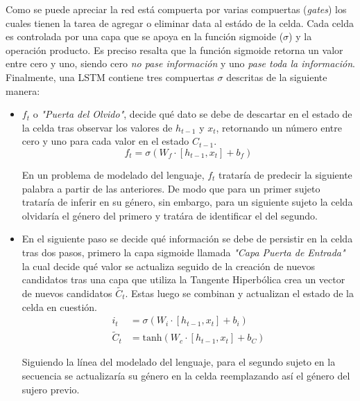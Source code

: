 \documentclass[12pt, letterpaper]{article}
\begin{document}
        Como se puede apreciar la red está compuerta por varias compuertas (\emph{gates}) los cuales tienen la tarea de agregar o eliminar data al estádo de la celda. Cada celda es controlada por una capa que se apoya en la función sigmoide ($\sigma$) y la operación producto. Es preciso resalta que la función sigmoide retorna un valor entre cero y uno, siendo cero \emph{no pase información} y uno \emph{pase toda la información}. Finalmente, una LSTM contiene tres compuertas $\sigma$ descritas de la siguiente manera:

        \begin{itemize}
            \item $f_t$ o \emph{"Puerta del Olvido"}, decide qué dato se debe de descartar en el estado de la celda tras observar los valores de $h_{t-1}$ y $x_t$, retornando un número entre cero y uno para cada valor en el estado $C_{t-1}$.
            \begin{equation}
                f_t = \sigma(W_f\cdot{[h_{t-1},x_t]} + b_f) 
            \end{equation}

            En un problema de modelado del lenguaje, $f_t$ trataría de predecir la siguiente palabra a partir de las anteriores. De modo que para un primer sujeto trataría de inferir en su género, sin embargo, para un siguiente sujeto la celda olvidaría el género del primero y tratára de identificar el del segundo.

            \item En el siguiente paso se decide qué información se debe de persistir en la celda tras dos pasos, primero la capa sigmoide llamada \emph{"Capa Puerta de Entrada"} la cual decide qué valor se actualiza seguido de la creación de nuevos candidatos tras una capa que utiliza la Tangente Hiperbólica crea un vector de nuevos candidatos $\tilde{C_t}$. Estas luego se combinan y actualizan el estado de la celda en cuestión.
            \begin{equation}
                \begin{aligned}
                    i_t &= \sigma(W_i\cdot{[h_{t-1}, x_t]} + b_i) \\
                    \tilde{C}_t &= \text{tanh}(W_c\cdot{[h_{t-1}, x_t]} +b_C)
                \end{aligned}
            \end{equation}

            Siguiendo la línea del modelado del lenguaje, para el segundo sujeto en la secuencia se actualizaría su género en la celda reemplazando así el género del sujero previo.


\end{itemize}
\end{document}

